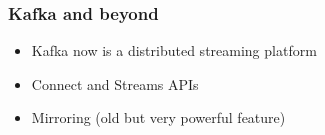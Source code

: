 \documentclass[12pt]{beamer}
\begin{document}
        \begin{frame}
            \begin{center}
                \frametitle{Kafka and beyond}
                \begin{itemize}
                    \item Kafka now is a distributed streaming platform
                    \item Connect and Streams APIs
                    \item Mirroring (old but very powerful feature)
                \end{itemize}
            \end{center}
        \end{frame}
     
    
\end{document}
